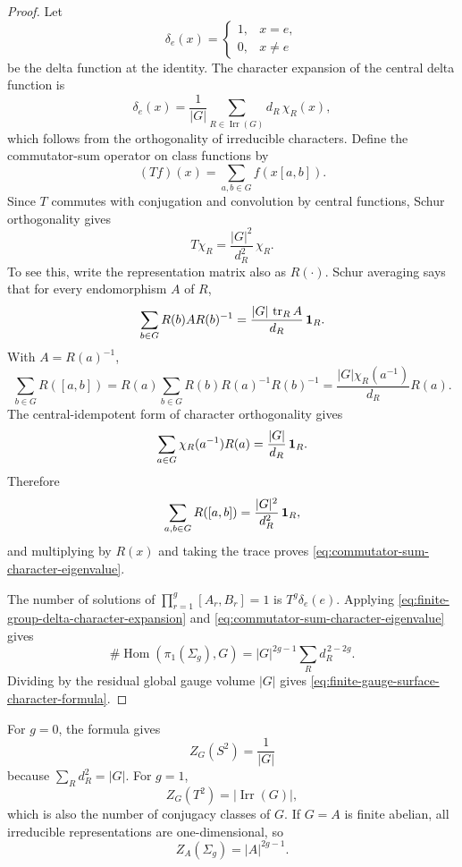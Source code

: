 \begin{proof}
Let
\[
  \delta_e(x)=
  \begin{cases}
  1,&x=e,\\
  0,&x\ne e
  \end{cases}
\]
be the delta function at the identity.  The character expansion of the
central delta function is
\begin{equation}
  \delta_e(x)
  =
  \frac{1}{|G|}
  \sum_{R\in\operatorname{Irr}(G)}d_R\,\chi_R(x),
  \label{eq:finite-group-delta-character-expansion}
\end{equation}
which follows from the orthogonality of irreducible characters.  Define the
commutator-sum operator on class functions by
\[
  (Tf)(x)
  =
  \sum_{a,b\in G} f(x[a,b]).
\]
Since \(T\) commutes with conjugation and convolution by central functions,
Schur orthogonality gives
\begin{equation}
  T\chi_R
  =
  \frac{|G|^2}{d_R^2}\,\chi_R.
  \label{eq:commutator-sum-character-eigenvalue}
\end{equation}
To see this, write the representation matrix also as \(R(\cdot)\).  Schur
averaging says that for every endomorphism \(A\) of \(R\),
\begin{equation}
  \sum_{b\in G} R(b)A R(b)^{-1}
  =
  \frac{|G|\,\operatorname{tr}_R A}{d_R}\,{\bf 1}_R.
  \label{eq:finite-schur-averaging}
\end{equation}
With \(A=R(a)^{-1}\),
\[
  \sum_{b\in G} R([a,b])
  =
  R(a)\sum_{b\in G}R(b)R(a)^{-1}R(b)^{-1}
  =
  \frac{|G|\chi_R(a^{-1})}{d_R}R(a).
\]
The central-idempotent form of character orthogonality gives
\[
  \sum_{a\in G}\chi_R(a^{-1})R(a)
  =
  \frac{|G|}{d_R}\,{\bf 1}_R.
\]
Therefore
\[
  \sum_{a,b\in G}R([a,b])
  =
  \frac{|G|^2}{d_R^2}\,{\bf 1}_R,
\]
and multiplying by \(R(x)\) and taking the trace proves
\eqref{eq:commutator-sum-character-eigenvalue}.

The number of solutions of
\(\prod_{r=1}^g[A_r,B_r]=1\) is \(T^g\delta_e(e)\).  Applying
\eqref{eq:finite-group-delta-character-expansion} and
\eqref{eq:commutator-sum-character-eigenvalue} gives
\[
  \#\operatorname{Hom}(\pi_1(\Sigma_g),G)
  =
  |G|^{2g-1}
  \sum_R d_R^{\,2-2g}.
\]
Dividing by the residual global gauge volume \(|G|\) gives
\eqref{eq:finite-gauge-surface-character-formula}.
\end{proof}

For \(g=0\), the formula gives
\[
  Z_G(S^2)=\frac{1}{|G|}
\]
because \(\sum_Rd_R^2=|G|\).  For \(g=1\),
\[
  Z_G(T^2)=|\operatorname{Irr}(G)|,
\]
which is also the number of conjugacy classes of \(G\).  If \(G=A\) is
finite abelian, all irreducible representations are one-dimensional, so
\begin{equation}
  Z_A(\Sigma_g)=|A|^{2g-1}.
  \label{eq:finite-abelian-surface-partition}
\end{equation}

